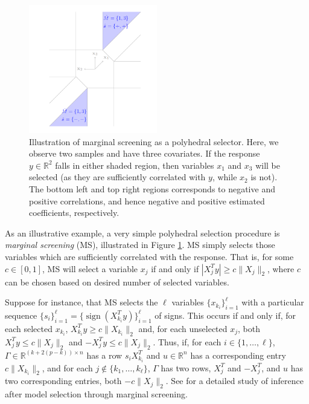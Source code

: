 \documentclass{article}
\newcommand{\R}{\mathbb{R}}
\newcommand{\sgn}{\operatorname{sign}}
\begin{document}
\begin{figure}[ht]
\begin{center}
\includegraphics[width=0.5\textwidth]{figures/polyhedral}
\end{center}
\vspace{-5mm}
\caption{Illustration of marginal screening as a polyhedral selector.
Here, we observe two samples and have three covariates. If the response
$y \in \R^2$ falls in either shaded region, then variables $x_1$ and $x_3$ will
be selected (as they are sufficiently correlated with $y$, while $x_2$ is not).
The bottom left and top right regions corresponds to negative and positive
correlations, and hence negative and positive estimated coefficients,
respectively.}
\label{fig:polyhedral}
\end{figure}

As an illustrative example, a very simple polyhedral selection procedure is
\emph{marginal screening} (MS), illustrated in Figure \ref{fig:polyhedral}. MS
simply selects those variables which are sufficiently correlated with the
response. That is, for some $c \in [0,1]$, MS will select a variable $x_j$ if
and only if $|X_j^Ty| \geq c\|X_j\|_2$, where $c$ can be chosen based on
desired number of selected variables.

Suppose for instance, that MS selects the
$\ell$ variables $\{x_{k_i}\}_{i = 1}^\ell$ with a particular sequence
$\{s_i\}_{i = 1}^\ell = \{\sgn(X_{k_i}^T y)\}_{i = 1}^\ell$ of signs. This
occurs if and only if, for each selected $x_{k_i}$,
$X_{k_i}^T y \geq c\|X_{k_i}\|_2$ and, for each unselected $x_j$,
both $X_j^Ty \leq c\|X_j\|_2$ and $-X_j^Ty \leq c\|X_j\|_2$. Thus, if, for each
$i \in \{1,\dots,\ell\}$, $\Gamma \in \R^{(k + 2(p - k)) \times n}$ has a row
$s_i X_{k_i}^T$ and $u \in \R^n$ has a corresponding entry $c\|X_{k_i}\|_2$,
and for each $j \notin \{k_1,\dots,k_\ell\}$, $\Gamma$ has two rows, $X_j^T$
and $-X_j^T$, and $u$ has two corresponding entries, both $-c\|X_j\|_2$.
See \citet{lee14marginalScreening} for a detailed study of inference after
model selection through marginal screening.
\end{document}
